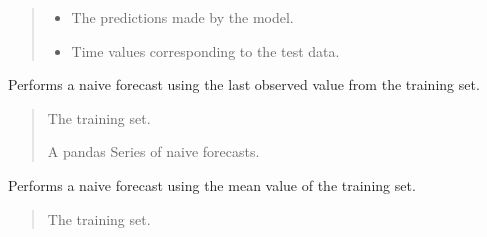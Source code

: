 \documentclass[letterpaper,10pt,english]{sphinxmanual}
\begin{document}
\begin{fulllineitems}
\begin{fulllineitems}
\begin{quote}
\begin{description}
\begin{itemize}
\item {} 
\sphinxAtStartPar
{} \textendash{} The predictions made by the model.

\item {} 
\sphinxAtStartPar
{} \textendash{} Time values corresponding to the test data.

\end{itemize}

\end{description}\end{quote}

\end{fulllineitems}


\begin{fulllineitems}
\label{\detokenize{docs/model_testing:model_testing.ModelTest.naive_forecast}}
\pysigstartsignatures
{}
\pysigstopsignatures
\sphinxAtStartPar
Performs a naive forecast using the last observed value from the training set.
\begin{quote}\begin{description}
\sphinxAtStartPar
{} \textendash{} The training set.

\sphinxAtStartPar
A pandas Series of naive forecasts.

\end{description}\end{quote}

\end{fulllineitems}


\begin{fulllineitems}
\label{\detokenize{docs/model_testing:model_testing.ModelTest.naive_mean_forecast}}
\pysigstartsignatures
{}
\pysigstopsignatures
\sphinxAtStartPar
Performs a naive forecast using the mean value of the training set.
\begin{quote}\begin{description}
\sphinxAtStartPar
{} \textendash{} The training set.


\end{description}
\end{quote}
\end{fulllineitems}
\end{fulllineitems}
\end{document}
